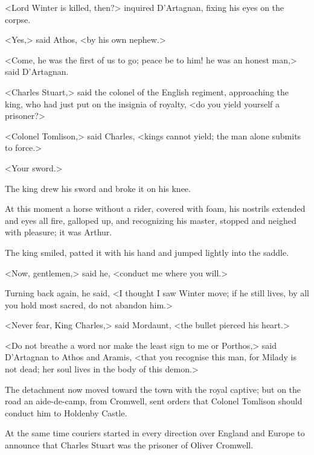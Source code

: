 <Lord Winter is killed, then?> inquired D'Artagnan, fixing his eyes on the corpse.

<Yes,> said Athos, <by his own nephew.>

<Come, he was the first of us to go; peace be to him! he was an honest man,> said D'Artagnan.

<Charles Stuart,> said the colonel of the English regiment, approaching the king, who had just put on the insignia of royalty, <do you yield yourself a prisoner?>

<Colonel Tomlison,> said Charles, <kings cannot yield; the man alone submits to force.>

<Your sword.>

The king drew his sword and broke it on his knee.

At this moment a horse without a rider, covered with foam, his nostrils extended and eyes all fire, galloped up, and recognizing his master, stopped and neighed with pleasure; it was Arthur.

The king smiled, patted it with his hand and jumped lightly into the saddle.

<Now, gentlemen,> said he, <conduct me where you will.>

Turning back again, he said, <I thought I saw Winter move; if he still lives, by all you hold most sacred, do not abandon him.>

<Never fear, King Charles,> said Mordaunt, <the bullet pierced his heart.>

<Do not breathe a word nor make the least sign to me or Porthos,> said D'Artagnan to Athos and Aramis, <that you recognise this man, for Milady is not dead; her soul lives in the body of this demon.>

The detachment now moved toward the town with the royal captive; but on the road an aide-de-camp, from Cromwell, sent orders that Colonel Tomlison should conduct him to Holdenby Castle.

At the same time couriers started in every direction over England and Europe to announce that Charles Stuart was the prisoner of Oliver Cromwell. 